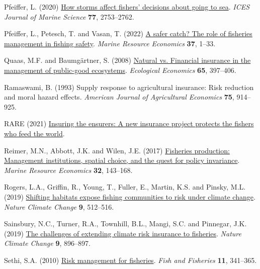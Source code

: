 \documentclass[
  letterpaper,
  DIV=11,
  numbers=noendperiod]{scrartcl}
\newlength{\cslhangindent}
\newlength{\cslentryspacingunit} %
\newenvironment{CSLReferences}[2] %
 {%
  \setlength{\parindent}{0pt}
  \ifodd #1
  \let\oldpar\par
  \def\par{\hangindent=\cslhangindent\oldpar}
  \fi
  \setlength{\parskip}{#2\cslentryspacingunit}
 }%
 {}
\theoremstyle{plain}
\theoremstyle{plain}
\theoremstyle{remark}
\begin{document}
\begin{CSLReferences}{1}{0}
\leavevmode{}%
Pfeiffer, L. (2020) \href{https://doi.org/10.1093/icesjms/fsaa145}{How
storms affect fishers' decisions about going to sea}. \emph{ICES Journal
of Marine Science} \textbf{77}, 2753--2762.

\leavevmode{}%
Pfeiffer, L., Petesch, T. and Vasan, T. (2022)
\href{https://doi.org/10.1086/716856}{A safer catch? The role of
fisheries management in fishing safety}. \emph{Marine Resource
Economics} \textbf{37}, 1--33.

\leavevmode{}%
Quaas, M.F. and Baumgärtner, S. (2008)
\href{https://doi.org/10.1016/j.ecolecon.2007.07.004}{Natural vs.
Financial insurance in the management of public-good ecosystems}.
\emph{Ecological Economics} \textbf{65}, 397--406.

\leavevmode{}%
Ramaswami, B. (1993) Supply response to agricultural insurance: Risk
reduction and moral hazard effects. \emph{American Journal of
Agricultural Economics} \textbf{75}, 914--925.

\leavevmode{}%
RARE (2021)
\href{https://rare.org/stories-articles/insuring-the-ensurers-rares-fish-forever-program-protects-the-fishers-who-feed-the-world/}{Insuring
the ensurers: A new insurance project protects the fishers who feed the
world}.

\leavevmode{}%
Reimer, M.N., Abbott, J.K. and Wilen, J.E. (2017)
\href{https://doi.org/10.1086/690678}{Fisheries production: Management
institutions, spatial choice, and the quest for policy invariance}.
\emph{Marine Resource Economics} \textbf{32}, 143--168.

\leavevmode{}%
Rogers, L.A., Griffin, R., Young, T., Fuller, E., Martin, K.S. and
Pinsky, M.L. (2019)
\href{https://doi.org/10.1038/s41558-019-0503-z}{Shifting habitats
expose fishing communities to risk under climate change}. \emph{Nature
Climate Change} \textbf{9}, 512--516.

\leavevmode{}%
Sainsbury, N.C., Turner, R.A., Townhill, B.L., Mangi, S.C. and Pinnegar,
J.K. (2019) \href{https://doi.org/10.1038/s41558-019-0645-z}{The
challenges of extending climate risk insurance to fisheries}.
\emph{Nature Climate Change} \textbf{9}, 896--897.

\leavevmode{}%
Sethi, S.A. (2010)
\href{https://doi.org/10.1111/j.1467-2979.2010.00363.x}{Risk management
for fisheries}. \emph{Fish and Fisheries} \textbf{11}, 341--365.


\end{CSLReferences}
\end{document}
